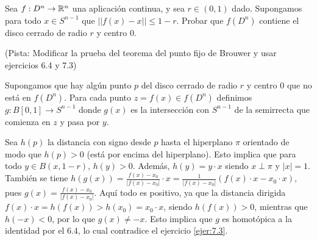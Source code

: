 \documentclass[twoside]{article}
\begin{document}
\begin{ejercicio}{7.4}
Sea $f:D^n\to\mathbb{R}^n$ una aplicación continua, y sea $r\in(0,1)$ dado. Supongamos para todo $x\in S^{n-1}$ que $||f(x)-x||\leq 1-r$. Probar que $f(D^n)$ contiene el disco cerrado de radio $r$ y centro 0.

(Pista: Modificar la prueba del teorema del punto fijo de Brouwer y usar ejercicios 6.4 y 7.3)
\end{ejercicio}
\begin{solucion}
Supongamos que hay algún punto $p$ del disco cerrado de radio $r$ y centro 0 que no está en $f(D^n)$. Para cada punto $z=f(x)\in f(D^n)$ definimos $g:B[0,1]\to S^{n-1}$ donde $g(x)$ es la intersección con $S^{n-1}$ de la semirrecta que comienza en $z$ y pasa por $y$. 

Sea $h(p)$ la distancia con signo desde $p$ hasta el hiperplano $\pi$ orientado de modo que $h(p)>0$ (está por encima del hiperplano). Esto implica que para todo $y\in B(x,1-r)$, $h(y)>0$. Además, $h(y)=y\cdot x$ siendo $x\perp \pi$ y $|x|=1$.  También se tiene $h(g(x))=\frac{f(x)-x_0}{|f(x)-x_0|}\cdot x=\frac{1}{|f(x)-x_0|}(f(x)\cdot x-x_0\cdot x)$, pues $g(x)=\frac{f(x)-x_0}{|f(x)-x_0|}$. Aquí todo es positivo, ya que la distancia dirigida $f(x)\cdot x=h(f(x))>h(x_0)=x_0\cdot x$, siendo $h(f(x))>0$, mientras que $h(-x)<0$, por lo que $g(x)\neq -x$. Esto implica que $g$ es homotópica a la identidad por el 6.4, lo cual contradice el ejercicio \ref{ejer:7.3}.

\begin{center}
\end{center}

\end{solucion}
\end{document}
